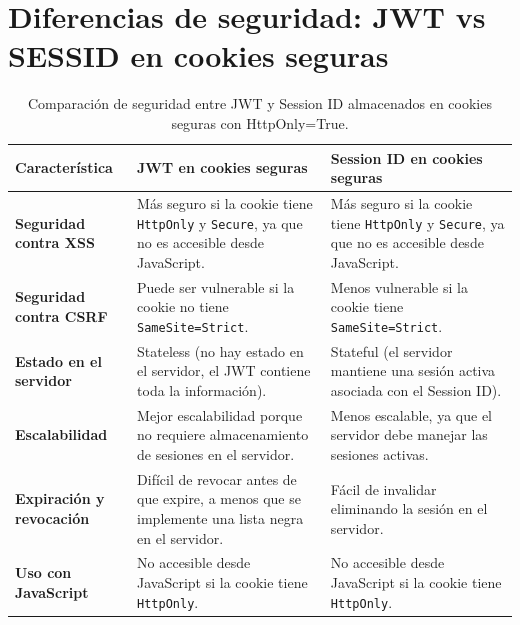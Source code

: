 \documentclass[a4paper,12pt]{report}
\begin{document}
	
\pagebreak

		
		
		\section{Diferencias de seguridad: JWT vs SESSID en cookies seguras}
		\label{sec:anexo_JWTvsSESSIONS}
						
			\FloatBarrier
			\begin{table}[h]
				\centering
				\begin{tabular}{|p{4cm}|p{5cm}|p{5cm}|}
					\hline
					\textbf{Característica} & \textbf{JWT en cookies seguras} & \textbf{Session ID en cookies seguras} \\
					\hline
					\textbf{Seguridad contra XSS} & Más seguro si la cookie tiene \texttt{HttpOnly} y \texttt{Secure}, ya que no es accesible desde JavaScript. & Más seguro si la cookie tiene \texttt{HttpOnly} y \texttt{Secure}, ya que no es accesible desde JavaScript. \\
					\hline
					\textbf{Seguridad contra CSRF} & Puede ser vulnerable si la cookie no tiene \texttt{SameSite=Strict}. & Menos vulnerable si la cookie tiene \texttt{SameSite=Strict}. \\
					\hline
					\textbf{Estado en el servidor} & Stateless (no hay estado en el servidor, el JWT contiene toda la información). & Stateful (el servidor mantiene una sesión activa asociada con el Session ID). \\
					\hline
					\textbf{Escalabilidad} & Mejor escalabilidad porque no requiere almacenamiento de sesiones en el servidor. & Menos escalable, ya que el servidor debe manejar las sesiones activas. \\
					\hline
					\textbf{Expiración y revocación} & Difícil de revocar antes de que expire, a menos que se implemente una lista negra en el servidor. & Fácil de invalidar eliminando la sesión en el servidor. \\
					\hline
					\textbf{Uso con JavaScript} & No accesible desde JavaScript si la cookie tiene \texttt{HttpOnly}. & No accesible desde JavaScript si la cookie tiene \texttt{HttpOnly}. \\
					\hline
				\end{tabular}
				\caption{Comparación de seguridad entre JWT y Session ID almacenados en cookies seguras con HttpOnly=True.}
				\label{tab:jwt_vs_session}
			\end{table}
			\FloatBarrier
	
		\pagebreak
		
\end{document}
